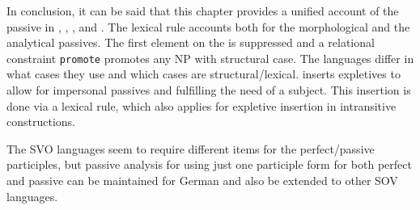 In conclusion, it can be said that this chapter provides a unified account of the passive in ,
, , and . The lexical rule accounts both for the morphological and the
analytical passives. The first element on the \argstl is suppressed and a relational constraint
\texttt{promote} promotes any NP with structural case. The languages differ in what cases they use and
which cases are structural/lexical.  inserts expletives to allow for impersonal passives and
fulfilling the need of a subject. This insertion is done via a lexical rule, which also applies for
expletive insertion in intransitive constructions.

The SVO languages seem to require different items for the perfect/passive participles, but 
passive analysis for  using just one participle form for both perfect and passive can be
maintained for German and also be extended to other SOV languages.




